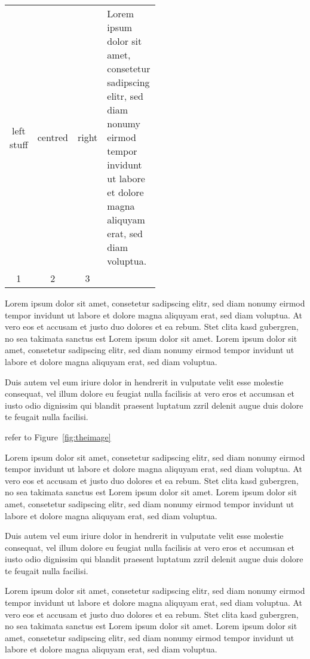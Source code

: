 \begin{tabular}{cccp{0.5\linewidth}}
	left stuff & centred & right & Lorem ipsum dolor sit amet, consetetur sadipscing elitr, sed diam nonumy eirmod tempor invidunt ut labore et dolore magna aliquyam erat, sed diam voluptua. \\
	1          & 2       & 3     &                                                                                                                                                             \\
\end{tabular}

Lorem ipsum dolor sit amet, consetetur sadipscing elitr, sed diam nonumy eirmod tempor invidunt ut labore et dolore magna aliquyam erat, sed diam voluptua. At vero eos et accusam et justo duo dolores et ea rebum. Stet clita kasd gubergren, no sea takimata sanctus est Lorem ipsum dolor sit amet. Lorem ipsum dolor sit amet, consetetur sadipscing elitr, sed diam nonumy eirmod tempor invidunt ut labore et dolore magna aliquyam erat, sed diam voluptua.

Duis autem vel eum iriure dolor in hendrerit in vulputate velit esse molestie consequat, vel illum dolore eu feugiat nulla facilisis at vero eros et accumsan et iusto odio dignissim qui blandit praesent luptatum zzril delenit augue duis dolore te feugait nulla facilisi.


refer to Figure~\vref{fig:theimage}


Lorem ipsum dolor sit amet, consetetur sadipscing elitr, sed diam nonumy eirmod tempor invidunt ut labore et dolore magna aliquyam erat, sed diam voluptua. At vero eos et accusam et justo duo dolores et ea rebum. Stet clita kasd gubergren, no sea takimata sanctus est Lorem ipsum dolor sit amet. Lorem ipsum dolor sit amet, consetetur sadipscing elitr, sed diam nonumy eirmod tempor invidunt ut labore et dolore magna aliquyam erat, sed diam voluptua.

Duis autem vel eum iriure dolor in hendrerit in vulputate velit esse molestie consequat, vel illum dolore eu feugiat nulla facilisis at vero eros et accumsan et iusto odio dignissim qui blandit praesent luptatum zzril delenit augue duis dolore te feugait nulla facilisi.

Lorem ipsum dolor sit amet, consetetur sadipscing elitr, sed diam nonumy eirmod tempor invidunt ut labore et dolore magna aliquyam erat, sed diam voluptua. At vero eos et accusam et justo duo dolores et ea rebum. Stet clita kasd gubergren, no sea takimata sanctus est Lorem ipsum dolor sit amet. Lorem ipsum dolor sit amet, consetetur sadipscing elitr, sed diam nonumy eirmod tempor invidunt ut labore et dolore magna aliquyam erat, sed diam voluptua.

